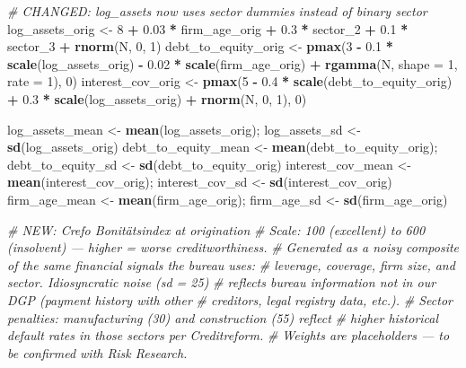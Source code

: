 \documentclass[
]{article}
\newenvironment{Shaded}{\begin{snugshade}}{\end{snugshade}}
\newcommand{\AttributeTok}[1]{\textcolor[rgb]{0.13,0.29,0.53}{#1}}
\newcommand{\CommentTok}[1]{\textcolor[rgb]{0.56,0.35,0.01}{\textit{#1}}}
\newcommand{\DecValTok}[1]{\textcolor[rgb]{0.00,0.00,0.81}{#1}}
\newcommand{\FloatTok}[1]{\textcolor[rgb]{0.00,0.00,0.81}{#1}}
\newcommand{\FunctionTok}[1]{\textcolor[rgb]{0.13,0.29,0.53}{\textbf{#1}}}
\newcommand{\NormalTok}[1]{#1}
\newcommand{\OtherTok}[1]{\textcolor[rgb]{0.56,0.35,0.01}{#1}}
\newcommand{\SpecialCharTok}[1]{\textcolor[rgb]{0.81,0.36,0.00}{\textbf{#1}}}
\begin{document}
\begin{Shaded}
\begin{Highlighting}[]
  \CommentTok{\# CHANGED: log\_assets now uses sector dummies instead of binary sector}
\NormalTok{  log\_assets\_orig     }\OtherTok{\textless{}{-}} \DecValTok{8} \SpecialCharTok{+} \FloatTok{0.03} \SpecialCharTok{*}\NormalTok{ firm\_age\_orig }\SpecialCharTok{+} \FloatTok{0.3} \SpecialCharTok{*}\NormalTok{ sector\_2 }\SpecialCharTok{+} \FloatTok{0.1} \SpecialCharTok{*}\NormalTok{ sector\_3 }\SpecialCharTok{+} \FunctionTok{rnorm}\NormalTok{(N, }\DecValTok{0}\NormalTok{, }\DecValTok{1}\NormalTok{)}
\NormalTok{  debt\_to\_equity\_orig }\OtherTok{\textless{}{-}} \FunctionTok{pmax}\NormalTok{(}\DecValTok{3} \SpecialCharTok{{-}} \FloatTok{0.1} \SpecialCharTok{*} \FunctionTok{scale}\NormalTok{(log\_assets\_orig) }\SpecialCharTok{{-}} \FloatTok{0.02} \SpecialCharTok{*} \FunctionTok{scale}\NormalTok{(firm\_age\_orig) }\SpecialCharTok{+}   \FunctionTok{rgamma}\NormalTok{(N, }\AttributeTok{shape =} \DecValTok{1}\NormalTok{, }\AttributeTok{rate =} \DecValTok{1}\NormalTok{), }\DecValTok{0}\NormalTok{)}
\NormalTok{  interest\_cov\_orig   }\OtherTok{\textless{}{-}} \FunctionTok{pmax}\NormalTok{(}\DecValTok{5} \SpecialCharTok{{-}} \FloatTok{0.4} \SpecialCharTok{*} \FunctionTok{scale}\NormalTok{(debt\_to\_equity\_orig) }\SpecialCharTok{+} \FloatTok{0.3} \SpecialCharTok{*} \FunctionTok{scale}\NormalTok{(log\_assets\_orig) }\SpecialCharTok{+} \FunctionTok{rnorm}\NormalTok{(N, }\DecValTok{0}\NormalTok{, }\DecValTok{1}\NormalTok{), }\DecValTok{0}\NormalTok{)}
  
\NormalTok{  log\_assets\_mean     }\OtherTok{\textless{}{-}} \FunctionTok{mean}\NormalTok{(log\_assets\_orig);     log\_assets\_sd     }\OtherTok{\textless{}{-}} \FunctionTok{sd}\NormalTok{(log\_assets\_orig)}
\NormalTok{  debt\_to\_equity\_mean }\OtherTok{\textless{}{-}} \FunctionTok{mean}\NormalTok{(debt\_to\_equity\_orig); debt\_to\_equity\_sd }\OtherTok{\textless{}{-}} \FunctionTok{sd}\NormalTok{(debt\_to\_equity\_orig)}
\NormalTok{  interest\_cov\_mean   }\OtherTok{\textless{}{-}} \FunctionTok{mean}\NormalTok{(interest\_cov\_orig);   interest\_cov\_sd   }\OtherTok{\textless{}{-}} \FunctionTok{sd}\NormalTok{(interest\_cov\_orig)}
\NormalTok{  firm\_age\_mean       }\OtherTok{\textless{}{-}} \FunctionTok{mean}\NormalTok{(firm\_age\_orig);       firm\_age\_sd       }\OtherTok{\textless{}{-}} \FunctionTok{sd}\NormalTok{(firm\_age\_orig)}
  
  \CommentTok{\# NEW: Crefo Bonitätsindex at origination}
  \CommentTok{\# Scale: 100 (excellent) to 600 (insolvent) — higher = worse creditworthiness.}
  \CommentTok{\# Generated as a noisy composite of the same financial signals the bureau uses:}
  \CommentTok{\# leverage, coverage, firm size, and sector. Idiosyncratic noise (sd = 25)}
  \CommentTok{\# reflects bureau information not in our DGP (payment history with other}
  \CommentTok{\# creditors, legal registry data, etc.).}
  \CommentTok{\# Sector penalties: manufacturing (30) and construction (55) reflect}
  \CommentTok{\# higher historical default rates in those sectors per Creditreform.}
  \CommentTok{\# Weights are placeholders — to be confirmed with Risk Research.}
  

\end{Highlighting}
\end{Shaded}
\end{document}
